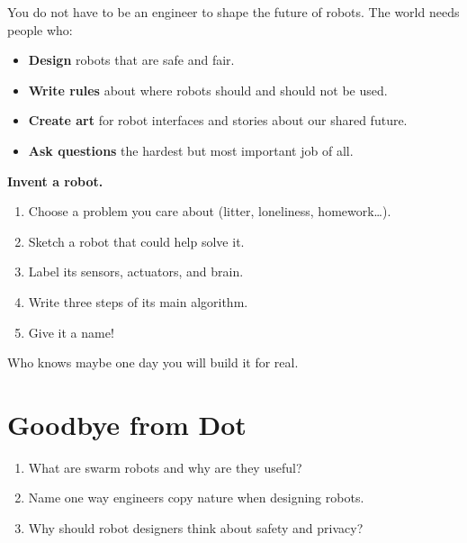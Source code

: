 You do not have to be an engineer to shape the future of robots.
The world needs people who:
\begin{itemize}
  \item \textbf{Design} robots that are safe and fair.
  \item \textbf{Write rules} about where robots should and should not be used.
  \item \textbf{Create art} for robot interfaces and stories about our shared future.
  \item \textbf{Ask questions} \textemdash{} the hardest but most important job of all.
\end{itemize}


\sectionrule

\begin{tryit}
  \textbf{Invent a robot.}
  \begin{enumerate}
    \item Choose a problem you care about (litter, loneliness, homework\ldots).
    \item Sketch a robot that could help solve it.
    \item Label its sensors, actuators, and brain.
    \item Write three steps of its main algorithm.
    \item Give it a name!
  \end{enumerate}
  Who knows \textemdash{} maybe one day you will build it for real.
\end{tryit}

\sectionrule

\section*{Goodbye from Dot}


\sectionrule


\begin{quickcheck}
  \begin{enumerate}
    \item What are swarm robots and why are they useful?
    \item Name one way engineers copy nature when designing robots.
    \item Why should robot designers think about safety and privacy?
  \end{enumerate}
\end{quickcheck}

